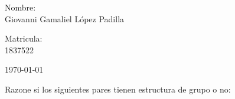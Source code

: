 \documentclass[12pt,letterpaper]{report}
\begin{document}
\begin{titlepage}
\begin{center}
\begin{minipage}{0.6\linewidth}
\changefontsizes{14pt}
Nombre:\\                                                                                                                                                                                                                                                           
Giovanni Gamaliel López Padilla\\
\end{minipage}
\begin{minipage}{0.2\linewidth}
\changefontsizes{14pt} 
Matricula:\\                                                                                                                        
1837522
\end{minipage}
\end{center}
\vspace{4cm}
\begin{flushright}
\today
\end{flushright}
\end{titlepage}
Razone si los siguientes pares tienen estructura de grupo o no:
\end{document}
